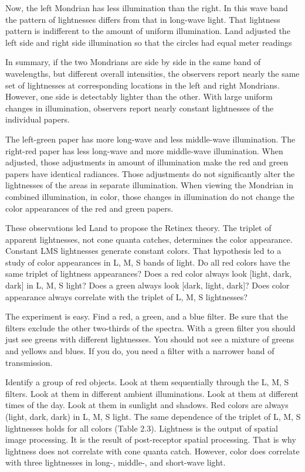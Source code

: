 
Now, the left Mondrian has less illumination than the right. In this wave band the pattern of lightnesses differs from that in long-wave light. That lightness pattern is indifferent to the amount of uniform illumination. Land adjusted the left side and right side illumination so that the circles had equal meter readings

In summary, if the two Mondrians are side by side in the same band of wavelengths, but different overall intensities, the observers report nearly the same set of lightnesses at corresponding locations in the left and right Mondrians. However, one side is detectably lighter than the other. With large uniform changes in illumination, observers report nearly constant lightnesses of the individual papers.

The left-green paper has more long-wave and less middle-wave illumination. The right-red paper has less long-wave and more middle-wave illumination. When adjusted, those adjustments in amount of illumination make the red and green papers have identical radiances. Those adjustments do not significantly alter the lightnesses of the areas in separate illumination. When viewing the Mondrian in combined illumination, in color, those changes in illumination do not change the color appearances of the red and green papers.


These observations led Land to propose the Retinex theory. The triplet of apparent lightnesses, not cone quanta catches, determines the color appearance. Constant LMS lightnesses generate constant colors. That hypothesis led to a study of color appearances in L, M, S bands of light. Do all red colors have the same triplet of lightness appearances? Does a red color always look [light, dark, dark] in L, M, S light? Does a green always look [dark, light, dark]? Does color appearance always correlate with the triplet of L, M, S lightnesses?

The experiment is easy. Find a red, a green, and a blue filter. Be sure that the filters exclude the other two-thirds of the spectra. With a green filter you should just see greens with different lightnesses. You should not see a mixture of greens and yellows and blues. If you do, you need a filter with a narrower band of transmission.

Identify a group of red objects. Look at them sequentially through the L, M, S filters. Look at them in different ambient illuminations. Look at them at different times of the day. Look at them in sunlight and shadows. Red colors are always (light, dark, dark) in L, M, S light. The same dependence of the triplet of L, M, S lightnesses holds for all colors (Table 2.3). Lightness is the output of spatial image processing. It is the result of post-receptor spatial processing. That is why lightness does not correlate with cone quanta catch. However, color does correlate with three lightnesses in long-, middle-, and short-wave light.


